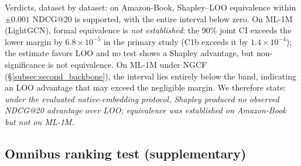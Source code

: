 \documentclass[pdflatex,sn-mathphys-num]{sn-jnl}
\begin{document}
\begin{table}[t]
\caption{Equivalence analysis, Shapley-MC vs.\ LOO-marginal, joint seed-mean user differences, 5 seeds, $B=10{,}000$ (SESOI margins declared a priori in the frozen protocol). ``CI favors LOO'' = the entire 90\% CI is negative. Verdicts are read directly off the interval against the margin.}\label{tab:equivalence}
\centering
{}
\end{table}

Verdicts, dataset by dataset: on Amazon-Book, Shapley--LOO equivalence within $\pm0.001$ NDCG@20 is supported, with the entire interval below zero. On ML-1M (LightGCN), formal equivalence is \emph{not established}: the 90\% joint CI exceeds the lower margin by $6.8\times10^{-5}$ in the primary study (C1b exceeds it by $1.4\times10^{-4}$); the estimate favors LOO and no test shows a Shapley advantage, but non-significance is not equivalence. On ML-1M under NGCF (\S\ref{subsec:second_backbone}), the interval lies entirely below the band, indicating an LOO advantage that may exceed the negligible margin. We therefore state: \emph{under the evaluated native-embedding protocol, Shapley produced no observed NDCG@20 advantage over LOO; equivalence was established on Amazon-Book but not on ML-1M.}

\subsection{Omnibus ranking test (supplementary)}\label{subsec:friedman}
\end{document}
